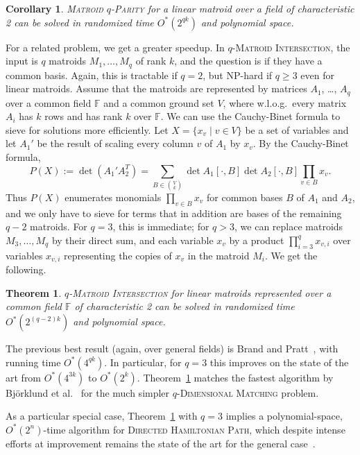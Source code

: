 \documentclass[10pt,a4paper]{article}
\newtheorem{theorem}{Theorem}[section]
\newtheorem{corollary}{Corollary}[section]
\newcommand{\F}{\ensuremath{\mathbb F}\xspace}
\begin{document}
\begin{corollary}
  \textsc{Matroid $q$-Parity} for a linear matroid over a field of
  characteristic 2 can be solved in randomized time $O^*(2^{qk})$ and
  polynomial space.  
\end{corollary}

For a related problem, we get a greater speedup. 
In \textsc{$q$-Matroid Intersection}, the input is $q$ matroids $M_1,
\ldots, M_q$ of rank $k$, and the question is if they have a common
basis. Again, this is tractable if $q=2$, but NP-hard if $q \geq 3$
even for linear matroids. Assume that the matroids are represented by
matrices $A_1$, \ldots, $A_q$ over a common field $\F$ and a common
ground set $V$, where w.l.o.g.\ every matrix $A_i$ has $k$ rows and
has rank $k$ over $\F$.
We can use the Cauchy-Binet formula to sieve for solutions more efficiently.
Let $X=\{x_v \mid v \in V\}$ be a set of variables and let $A_1'$ be
the result of scaling every column $v$ of $A_1$ by $x_v$.
By the Cauchy-Binet formula,
\[
  P(X) := \det (A_1' A_2^T) = \sum_{B \in \binom{V}{k}} \det
  A_1[\cdot,B] \det A_2[\cdot,B] \prod_{v \in B} x_v.
\]
Thus $P(X)$ enumerates monomials $\prod_{v \in B} x_v$ for
common bases $B$ of $A_1$ and $A_2$, and we only have to sieve for
terms that in addition are bases of the remaining $q-2$ matroids. 
For $q=3$, this is immediate; for $q>3$, we can replace matroids $M_3, \ldots, M_q$
by their direct sum, and each variable $x_v$ by a product $\prod_{i=3}^q x_{v,i}$
over variables $x_{v,i}$ representing the copies of $x_v$ in the matroid $M_i$.
We get the following. 

\begin{theorem} \label{ithm:matroid-intersection}
  \textsc{$q$-Matroid Intersection} for linear matroids represented
  over a common field $\F$ of characteristic 2 can be solved in
  randomized time $O^*(2^{(q-2)k})$ and polynomial space.
\end{theorem}

The previous best result (again, over general fields) is Brand and Pratt~\cite{BrandP21}, with
running time $O^*(4^{qk})$. In particular, for $q=3$ this improves on
the state of the art from $O^*(4^{3k})$ to $O^*(2^k)$.
Theorem~\ref{ithm:matroid-intersection} matches the fastest algorithm
by Bj\"orklund et al.~\cite{BjorklundHKK17narrow}
for the much simpler \textsc{$q$-Dimensional Matching} problem.

As a particular special case, Theorem~\ref{ithm:matroid-intersection} with $q=3$ 
implies a polynomial-space, $O^*(2^n)$-time algorithm for \textsc{Directed Hamiltonian Path},
which despite intense efforts at improvement remains the state of the
art for the general case~\cite{Bellman62,BjorklundKK17directed,CyganKN18hamilton}. 
\end{document}
